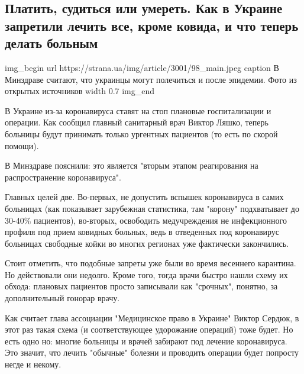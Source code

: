  
 
 

\subsection{Платить, судиться или умереть. Как в Украине запретили лечить все, кроме ковида, и что теперь делать больным}
\label{sec:10_11_2020.news.ua.strana.2.kovid}


\ifcmt
img_begin 
  url https://strana.ua/img/article/3001/98_main.jpeg
  caption В Минздраве считают, что украинцы могут полечиться и после эпидемии. Фото из открытых источников 
  width 0.7
img_end
\fi

В Украине из-за коронавируса ставят на стоп плановые госпитализации и операции.
Как сообщил главный санитарный врач Виктор Ляшко, теперь больницы будут
принимать только ургентных пациентов (то есть по скорой помощи). 

В Минздраве пояснили: это является "вторым этапом реагирования на
распространение коронавируса".

Главных целей две. Во-первых, не допустить вспышек коронавируса в самих
больницах (как показывает зарубежная статистика, там "корону" подхватывает до
30-40\% пациентов), во-вторых, освободить медучреждения не инфекционного
профиля под прием ковидных больных, ведь в отведенных под коронавирус больницах
свободные койки во многих регионах уже фактически закончились.

Стоит отметить, что подобные запреты уже были во время весеннего карантина. Но
действовали они недолго. Кроме того, тогда врачи быстро нашли схему их обхода:
плановых пациентов просто записывали как "срочных", понятно, за дополнительный
гонорар врачу.

Как считает глава ассоциации "Медицинское право в Украине" Виктор Сердюк, в
этот раз такая схема (и соответствующее удорожание операций) тоже будет. Но
есть одно но: многие больницы и врачей забирают под лечение коронавируса. Это
значит, что лечить "обычные" болезни и проводить операции будет попросту негде
и некому.

